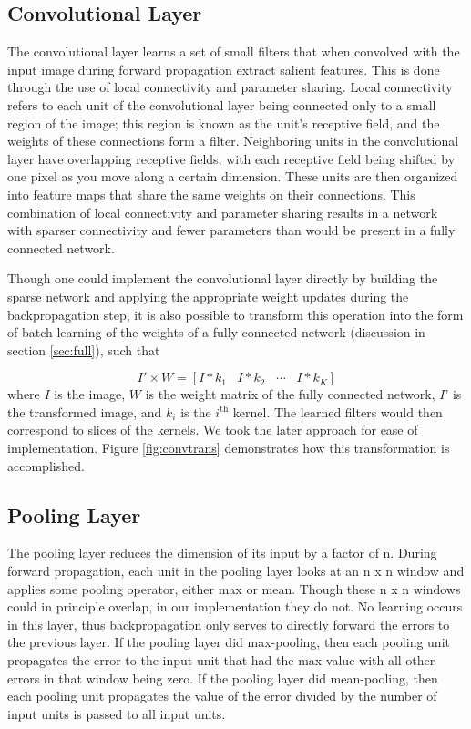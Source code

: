 \documentclass[10pt,twocolumn,letterpaper]{article}
\begin{document}
\subsection{Convolutional Layer}

The convolutional layer learns a set of small filters that when convolved with the input image
during forward propagation extract salient features. This is done through the use of local
connectivity and parameter sharing. Local connectivity refers to each unit of the convolutional
layer being connected only to a small region of the image; this region is known as the unit’s
receptive field, and the weights of these connections form a filter. Neighboring units in the
convolutional layer have overlapping receptive fields, with each receptive field being shifted
by one pixel as you move along a certain dimension. These units are then organized into feature
maps that share the same weights on their connections. This combination of local connectivity
and parameter sharing results in a network with sparser connectivity and fewer parameters than
would be present in a fully connected network.

Though one could implement the convolutional layer directly by building the sparse network and
applying the appropriate weight updates during the backpropagation step, it is also possible to
transform this operation into the form of batch learning of the weights of a fully connected
network (discussion in section \ref{sec:full}), such that

$$ I' \times W = [I*k_1 \hspace{10pt} I*k_2 \hspace{10pt} \cdots \hspace{10pt} I*k_K]$$
where $I$ is the image, $W$ is the weight matrix of the fully connected network, $I$’ is the transformed
image, and $k_i$ is the $i^{\text{th}}$ kernel. The learned filters would then correspond to slices of the kernels.
We took the later approach for ease of implementation. Figure \ref{fig:convtrans} demonstrates how this transformation
is accomplished.

\subsection{Pooling Layer}

The pooling layer reduces the dimension of its input by a factor of n. During forward propagation, each
unit in the pooling layer looks at an n x n window and applies some pooling operator, either max or mean.
Though these n x n windows could in principle overlap, in our implementation they do not. No learning occurs
in this layer, thus backpropagation only serves to directly forward the errors to the previous layer.
If the pooling layer did max-pooling, then each pooling unit propagates the error to the input unit that
had the max value with all other errors in that window being zero. If the pooling layer did mean-pooling,
then each pooling unit propagates the value of the error divided by the number of input units is passed to all input units.
\end{document}
